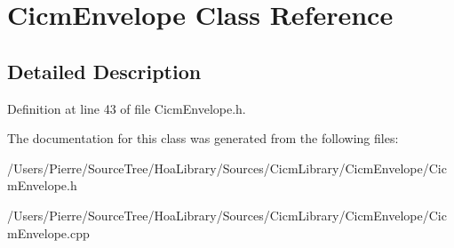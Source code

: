 \hypertarget{class_cicm_envelope}{\section{Cicm\-Envelope Class Reference}
\label{class_cicm_envelope}
}


\subsection{Detailed Description}


Definition at line 43 of file Cicm\-Envelope.\-h.



The documentation for this class was generated from the following files\-:\begin{DoxyCompactItemize}
\item 
/\-Users/\-Pierre/\-Source\-Tree/\-Hoa\-Library/\-Sources/\-Cicm\-Library/\-Cicm\-Envelope/Cicm\-Envelope.\-h\item 
/\-Users/\-Pierre/\-Source\-Tree/\-Hoa\-Library/\-Sources/\-Cicm\-Library/\-Cicm\-Envelope/Cicm\-Envelope.\-cpp\end{DoxyCompactItemize}

